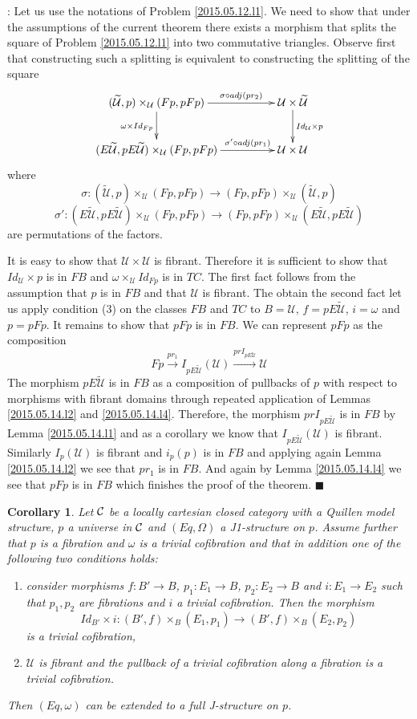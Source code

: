 \documentclass[12pt]{article}
\numberwithin{equation}{section}
\newenvironment{myproof}{{\bf Proof}:}{$\blacksquare$ \vskip 5mm }
\newtheorem{cor}[proposition]{Corollary}
\newcommand{\llabel}[1]{\label{#1}}
\newcommand{\sr}{\rightarrow}
\newcommand{\wt}{\widetilde}
\newcommand{\U}{\mathcal{U}}
\begin{document}
\begin{myproof}
Let us use the notations of Problem \ref{2015.05.12.l1}. We need to show that
under the assumptions of the current theorem there exists a morphism that
splits the square of Problem \ref{2015.05.12.l1} into two commutative
triangles. Observe first that constructing such a splitting is equivalent to
constructing the splitting of the square
%
$$
\begin{xy}
          \xymatrix@C=4pc{ (\wt{\U},p)\times_\U (Fp,pFp) \ar[r]^-{\sigma\circ
              adj(pr_2)} \ar[d]_{\omega \times Id_{Fp}} & \U\times\wt{\U}
            \ar[d]^{Id_\U\times p}\\ (E\wt{\U},pE\wt{\U})\times_\U (Fp,pFp)
            \ar[r]^-{\sigma'\circ adj(pr_1)} & \U\times \U }
\end{xy}
$$
%
where
%
$$\sigma:(\wt{\U},p)\times_\U (Fp,pFp)\sr (Fp,pFp)\times_\U (\wt{\U},p)$$
$$\sigma':(E\wt{\U},pE\wt{\U})\times_\U (Fp,pFp) \sr (Fp,pFp) \times_\U
(E\wt{\U},pE\wt{\U})$$
%
are permutations of the factors.

It is easy to show that $\U\times \U$ is fibrant. Therefore it is sufficient to
show that $Id_\U\times p$ is in $FB$ and $\omega\times_\U Id_{Fp}$ is in
$TC$. The first fact follows from the assumption that $p$ is in $FB$ and that
$\U$ is fibrant. The obtain the second fact let us apply condition (3) on the
classes $FB$ and $TC$ to $B=\U$, $f=pE\wt{\U}$, $i=\omega$ and $p=pFp$.  It
remains to show that $pFp$ is in $FB$. We can represent $pFp$ as the
composition
%
$$Fp\stackrel{pr_1}{\sr} I_{pE\wt{\U}}(\U) \stackrel{prI_{pE\wt{\U}}}{\sr} \U$$
%
The morphism $pE\wt{\U}$ is in $FB$ as a composition of pullbacks of $p$ with
respect to morphisms with fibrant domains through repeated application of
Lemmas \ref{2015.05.14.l2} and \ref{2015.05.14.l4}. Therefore, the morphism
$prI_{pE\wt{\U}}$ is in $FB$ by Lemma \ref{2015.05.14.l1} and as a corollary we
know that $I_{pE\wt{\U}}(\U)$ is fibrant. Similarly $I_p(\U)$ is fibrant and
$i_p(p)$ is in $FB$ and applying again Lemma \ref{2015.05.14.l2} we see that
$pr_1$ is in $FB$. And again by Lemma \ref{2015.05.14.l4} we see that $pFp$ is
in $FB$ which finishes the proof of the theorem.
\end{myproof}
%
\begin{cor}
\llabel{2015.05.18.cor1} Let $\cal C$ be a locally cartesian closed category
with a Quillen model structure, $p$ a universe in $\cal C$ and $(Eq,\Omega)$ a
J1-structure on $p$. Assume further that $p$ is a fibration and $\omega$ is a
trivial cofibration and that in addition one of the following two conditions
holds:
%
\begin{enumerate}
\item consider morphisms $f: B'\sr B$, $p_1:E_1\sr B$, $p_2:E_2\sr B$ and
  $i:E_1\sr E_2$ such that $p_1,p_2$ are fibrations and $i$ a trivial
  cofibration. Then the morphism
%
$$Id_{B'}\times i: (B',f)\times_B(E_1,p_1)\sr (B',f)\times_B(E_2,p_2)$$
%
is a trivial cofibration,
%
\item $\U$ is fibrant and the pullback of a trivial cofibration along a
  fibration is a trivial cofibration.
\end{enumerate}
%
Then $(Eq,\omega)$ can be extended to a full J-structure on $p$.
\end{cor}
\end{document}
